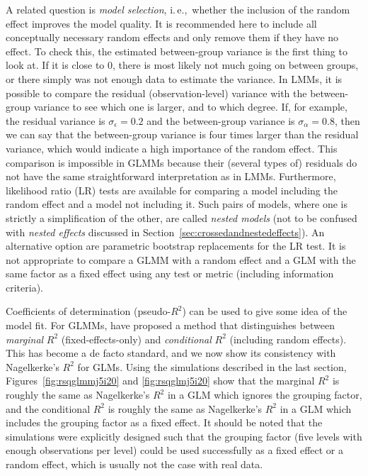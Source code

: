 \documentclass[a4paper,12pt]{article}
\newcommand{\ie}{i.\,e.,\ }
\begin{document}
A related question is \textit{model selection}, \ie whether the inclusion of the random effect improves the model quality.
It is recommended here to include all conceptually necessary random effects and only remove them if they have no effect.
To check this, the estimated between-group variance is the first thing to look at.
If it is close to $0$, there is most likely not much going on between groups, or there simply was not enough data to estimate the variance.
In LMMs, it is possible to compare the residual (observation-level) variance with the between-group variance to see which one is larger, and to which degree.
If, for example, the residual variance is $\sigma_{\epsilon}=0.2$ and the between-group variance is $\sigma_{\alpha}=0.8$, then we can say that the between-group variance is four times larger than the residual variance, which would indicate a high importance of the random effect.
This comparison is impossible in GLMMs because their (several types of) residuals do not have the same straightforward interpretation as in LMMs.
Furthermore, likelihood ratio (LR) tests are available for comparing a model including the random effect and a model not including it.
Such pairs of models, where one is strictly a simplification of the other, are called \textit{nested models} (not to be confused with \textit{nested effects} discussed in Section~\ref{sec:crossedandnestedeffects}).
An alternative option are parametric bootstrap replacements for the LR test.
It is not appropriate to compare a GLMM with a random effect and a GLM with the same factor as a fixed effect using any test or metric (including information criteria).

Coefficients of determination (pseudo-$R^2$) can be used to give some idea of the model fit.
For GLMMs, \citet{NakagawaSchielzeth2013} have proposed a method that distinguishes between \textit{marginal} $R^2$ (fixed-effects-only) and \textit{conditional} $R^2$ (including random effects).
This has become a de facto standard, and we now show its consistency with Nagelkerke's $R^2$ for GLMs.
Using the simulations described in the last section, Figures~\ref{fig:rsqglmmj5i20} and \ref{fig:rsqglmj5i20} show that the marginal $R^2$ is roughly the same as Nagelkerke's $R^2$ in a GLM which ignores the grouping factor, and the conditional $R^2$ is roughly the same as Nagelkerke's $R^2$ in a GLM which includes the grouping factor as a fixed effect.
It should be noted that the simulations were explicitly designed such that the grouping factor (five levels with enough observations per level) could be used successfully as a fixed effect or a random effect, which is usually not the case with real data.
\end{document}

